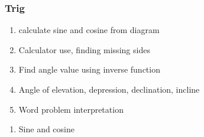\documentclass[12pt, oneside]{article}
\begin{document}
\subsubsection*{Trig}
  \begin{enumerate}
  \item calculate sine and cosine from diagram
  \item Calculator use, finding missing sides
  \item Find angle value using inverse function
  \item Angle of elevation, depression, declination, incline
  \item Word problem interpretation
  \end{enumerate}

  \begin{enumerate}
    \subsubsection*{Diagrams}
    \item Sine and cosine


  \end{enumerate}
\end{document}
